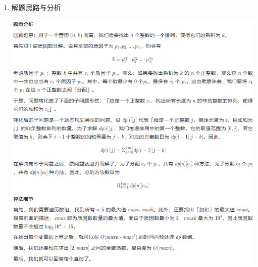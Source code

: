 \documentclass[9pt, b5paaper]{book}
\begin{document}
\begin{enumerate}
\item 解题思路与分析
\label{sec-1-4-63-1}

\includegraphics[width=.9\linewidth]{./pic/1735.png}


\end{enumerate}
\end{document}
